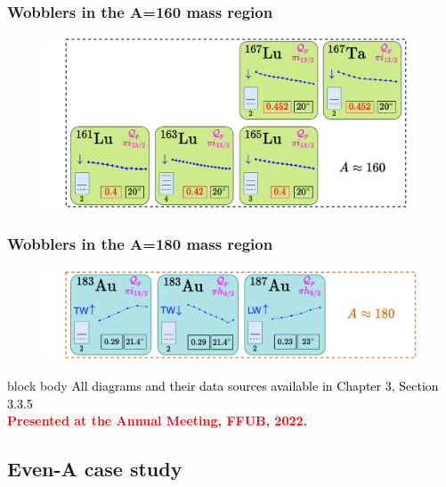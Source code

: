 \documentclass{beamer}
\begin{document}
\begin{frame}
	\frametitle{Wobblers in the A=160 mass region}
	\begin{figure}
		\centering
		\includegraphics[width=0.99\textwidth]{figures/wobblers-chart-4.pdf}
	\end{figure}
\end{frame}

\begin{frame}
	\frametitle{Wobblers in the A=180 mass region}
	\begin{figure}
		\centering
		\includegraphics[width=0.99\textwidth]{figures/wobblers-chart-3.pdf}
	\end{figure}
	\begin{beamercolorbox}[rounded=true,shadow=false, wd=\linewidth,]{block body}
		\centering
		\textcolor{black}{All diagrams and their data sources available in Chapter 3, Section 3.3.5}\\
		\textcolor{red}{\textbf{Presented at the Annual Meeting, FFUB, 2022.}}
	\end{beamercolorbox}
\end{frame}

\subsection{Even-A case study}
\end{document}
